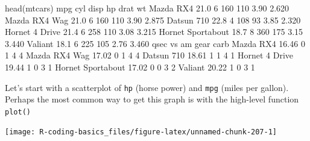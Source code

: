 \documentclass[
]{book}
\newenvironment{Shaded}{\begin{snugshade}}{\end{snugshade}}
\newcommand{\CommentTok}[1]{\textcolor[rgb]{0.56,0.35,0.01}{\textit{#1}}}
\newcommand{\DecValTok}[1]{\textcolor[rgb]{0.00,0.00,0.81}{#1}}
\newcommand{\FloatTok}[1]{\textcolor[rgb]{0.00,0.00,0.81}{#1}}
\newcommand{\FunctionTok}[1]{\textcolor[rgb]{0.00,0.00,0.00}{#1}}
\newcommand{\NormalTok}[1]{#1}
\newcommand{\SpecialCharTok}[1]{\textcolor[rgb]{0.00,0.00,0.00}{#1}}
\begin{document}
\begin{Shaded}
\begin{Highlighting}[]
\FunctionTok{head}\NormalTok{(mtcars)}
\NormalTok{                   mpg cyl disp  hp drat    wt}
\NormalTok{Mazda RX4         }\FloatTok{21.0}   \DecValTok{6}  \DecValTok{160} \DecValTok{110} \FloatTok{3.90} \FloatTok{2.620}
\NormalTok{Mazda RX4 Wag     }\FloatTok{21.0}   \DecValTok{6}  \DecValTok{160} \DecValTok{110} \FloatTok{3.90} \FloatTok{2.875}
\NormalTok{Datsun }\DecValTok{710}        \FloatTok{22.8}   \DecValTok{4}  \DecValTok{108}  \DecValTok{93} \FloatTok{3.85} \FloatTok{2.320}
\NormalTok{Hornet }\DecValTok{4}\NormalTok{ Drive    }\FloatTok{21.4}   \DecValTok{6}  \DecValTok{258} \DecValTok{110} \FloatTok{3.08} \FloatTok{3.215}
\NormalTok{Hornet Sportabout }\FloatTok{18.7}   \DecValTok{8}  \DecValTok{360} \DecValTok{175} \FloatTok{3.15} \FloatTok{3.440}
\NormalTok{Valiant           }\FloatTok{18.1}   \DecValTok{6}  \DecValTok{225} \DecValTok{105} \FloatTok{2.76} \FloatTok{3.460}
\NormalTok{                   qsec vs am gear carb}
\NormalTok{Mazda RX4         }\FloatTok{16.46}  \DecValTok{0}  \DecValTok{1}    \DecValTok{4}    \DecValTok{4}
\NormalTok{Mazda RX4 Wag     }\FloatTok{17.02}  \DecValTok{0}  \DecValTok{1}    \DecValTok{4}    \DecValTok{4}
\NormalTok{Datsun }\DecValTok{710}        \FloatTok{18.61}  \DecValTok{1}  \DecValTok{1}    \DecValTok{4}    \DecValTok{1}
\NormalTok{Hornet }\DecValTok{4}\NormalTok{ Drive    }\FloatTok{19.44}  \DecValTok{1}  \DecValTok{0}    \DecValTok{3}    \DecValTok{1}
\NormalTok{Hornet Sportabout }\FloatTok{17.02}  \DecValTok{0}  \DecValTok{0}    \DecValTok{3}    \DecValTok{2}
\NormalTok{Valiant           }\FloatTok{20.22}  \DecValTok{1}  \DecValTok{0}    \DecValTok{3}    \DecValTok{1}
\end{Highlighting}
\end{Shaded}

Let's start with a scatterplot of \texttt{hp} (horse power) and \texttt{mpg} (miles per
gallon). Perhaps the most common way to get this graph is with the high-level
function \texttt{plot()}

\begin{Shaded}
\end{Shaded}

\begin{center}\texttt{[image: R-coding-basics\_files/figure-latex/unnamed-chunk-207-1]} \end{center}
\end{document}
